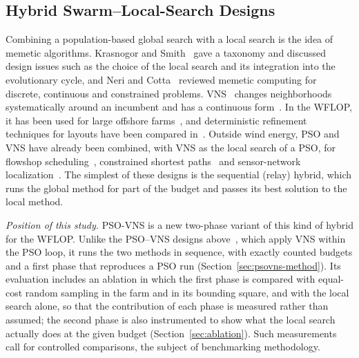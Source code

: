 \subsection{Hybrid Swarm--Local-Search Designs}
\label{sec:related-hybrid}
Combining a population-based global search with a local search is the idea of memetic algorithms. Krasnogor and Smith~\cite{Krasnogor2005} gave a taxonomy and discussed design issues such as the choice of the local search and its integration into the evolutionary cycle, and Neri and Cotta~\cite{Neri2012} reviewed memetic computing for discrete, continuous and constrained problems. VNS~\cite{Mladenovic1997,Hansen2001} changes neighborhoods systematically around an incumbent and has a continuous form~\cite{Mladenovic2008}. In the WFLOP, it has been used for large offshore farms~\cite{Cazzaro2022}, and deterministic refinement techniques for layouts have been compared in~\cite{Nagpal2021}. Outside wind energy, PSO and VNS have already been combined, with VNS as the local search of a PSO, for flowshop scheduling~\cite{Tasgetiren2007}, constrained shortest paths~\cite{Marinakis2017} and sensor-network localization~\cite{Gumaida2019}. The simplest of these designs is the sequential (relay) hybrid, which runs the global method for part of the budget and passes its best solution to the local method.

\emph{Position of this study.} PSO-VNS is a new two-phase variant of this kind of hybrid for the WFLOP. Unlike the PSO--VNS designs above~\cite{Tasgetiren2007,Marinakis2017,Gumaida2019}, which apply VNS within the PSO loop, it runs the two methods in sequence, with exactly counted budgets and a first phase that reproduces a PSO run (Section~\ref{sec:psovns-method}). Its evaluation includes an ablation in which the first phase is compared with equal-cost random sampling in the farm and in its bounding square, and with the local search alone, so that the contribution of each phase is measured rather than assumed; the second phase is also instrumented to show what the local search actually does at the given budget (Section~\ref{sec:ablation}). Such measurements call for controlled comparisons, the subject of benchmarking methodology.

